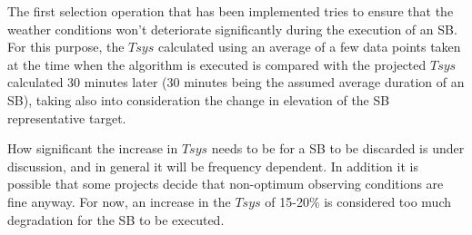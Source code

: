 \documentclass{article}
\begin{document}
The first selection operation that has been implemented tries to ensure that
the weather conditions won't deteriorate significantly during the execution of
an SB. For this purpose, the $Tsys$ calculated using an average of a few data
points taken at the time when the algorithm is executed is compared with the
projected $Tsys$ calculated 30 minutes later (30 minutes being the assumed
average duration of an SB), taking also into consideration the change in elevation
of the SB representative target.

How significant the increase in $Tsys$ needs to be for a SB to be discarded
is under discussion, and in general it will be frequency dependent. In addition
it is possible that some projects decide that non-optimum observing conditions are
fine anyway. For now, an increase in the $Tsys$  of 15-20\% is considered too much
degradation for the SB to be executed.
\end{document}
